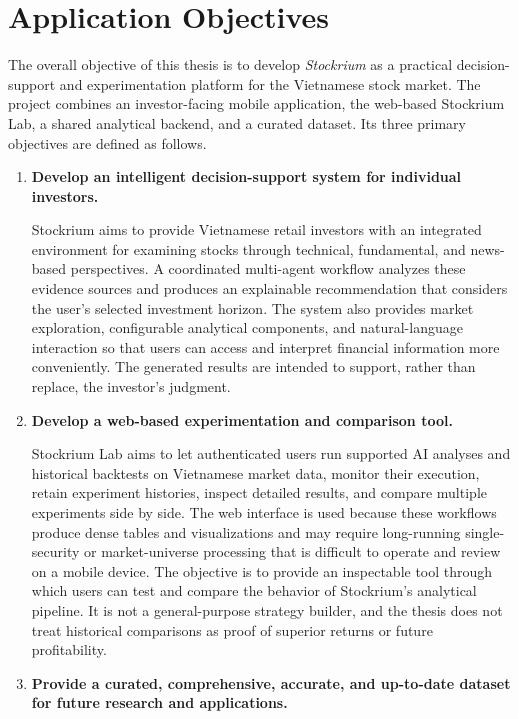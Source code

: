 \section{Application Objectives}
\label{sec:application-objectives}

The overall objective of this thesis is to develop \textit{Stockrium} as a practical decision-support and experimentation platform for the Vietnamese stock market. The project combines an investor-facing mobile application, the web-based Stockrium Lab, a shared analytical backend, and a curated dataset. Its three primary objectives are defined as follows.

\begin{enumerate}[label=\textbf{O\arabic*.}, leftmargin=1.7cm]
    \item \textbf{Develop an intelligent decision-support system for individual investors.}

    Stockrium aims to provide Vietnamese retail investors with an integrated environment for examining stocks through technical, fundamental, and news-based perspectives. A coordinated multi-agent workflow analyzes these evidence sources and produces an explainable recommendation that considers the user's selected investment horizon. The system also provides market exploration, configurable analytical components, and natural-language interaction so that users can access and interpret financial information more conveniently. The generated results are intended to support, rather than replace, the investor's judgment.

    \item \textbf{Develop a web-based experimentation and comparison tool.}

    Stockrium Lab aims to let authenticated users run supported AI analyses and historical backtests on Vietnamese market data, monitor their execution, retain experiment histories, inspect detailed results, and compare multiple experiments side by side. The web interface is used because these workflows produce dense tables and visualizations and may require long-running single-security or market-universe processing that is difficult to operate and review on a mobile device. The objective is to provide an inspectable tool through which users can test and compare the behavior of Stockrium's analytical pipeline. It is not a general-purpose strategy builder, and the thesis does not treat historical comparisons as proof of superior returns or future profitability.

    \item \textbf{Provide a curated, comprehensive, accurate, and up-to-date dataset for future research and applications.}


\end{enumerate}
